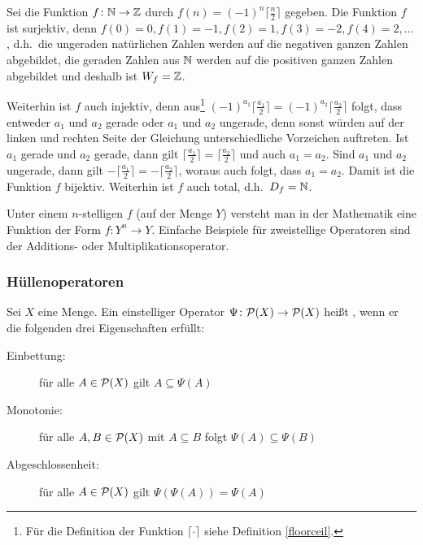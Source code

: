 \begin{example}
Sei die Funktion $f \colon \mathbb N \rightarrow \mathbb Z$ durch $f(n) = (-1)^n
\lceil \frac{n}{2} \rceil$ gegeben. Die Funktion $f$ ist surjektiv,
denn $f(0) = 0, f(1) = -1, f(2) = 1, f(3) = -2, f(4) = 2, \dots$, d.h.~die 
ungeraden natürlichen Zahlen werden auf die negativen ganzen Zahlen 
abgebildet, die geraden Zahlen aus $\mathbb N$ werden auf die positiven
ganzen Zahlen abgebildet und deshalb ist $W_f = \mathbb Z$.

Weiterhin ist $f$ auch injektiv, denn aus\footnote{Für die Definition
der Funktion $\lceil \cdot \rceil$ siehe Definition \ref{floorceil}.}
$(-1)^{a_1} \lceil \frac{a_1}{2} \rceil = (-1)^{a_2}
\lceil \frac{a_2}{2} \rceil$ folgt, dass entweder $a_1$ und $a_2$
gerade oder $a_1$ und $a_2$ ungerade, denn sonst würden auf der linken
und rechten Seite der Gleichung unterschiedliche Vorzeichen
auftreten. Ist $a_1$ gerade und $a_2$ gerade, dann gilt
$\lceil \frac{a_1}{2} \rceil = \lceil \frac{a_2}{2} \rceil$ und auch
$a_1 = a_2$. Sind $a_1$ und $a_2$ ungerade, dann gilt
$-\lceil \frac{a_1}{2} \rceil = -\lceil \frac{a_2}{2} \rceil$, woraus
auch folgt, dass $a_1 = a_2$.
%
Damit ist die Funktion $f$ bijektiv. Weiterhin ist $f$ auch total,
d.h.~$D_f = \mathbb N$.
\end{example}

\begin{definition}
Unter einem $n$-stelligen  $f$ (auf der Menge $Y$) versteht man in der Mathematik eine Funktion der Form $f \colon Y^n \rightarrow Y$.  Einfache Beispiele für zweistellige Operatoren sind der Additions- oder Multiplikationsoperator.
\end{definition}

\subsubsection{Hüllenoperatoren}

\begin{definition}
Sei $X$ eine Menge. Ein einstelliger Operator $\Psi \colon \mathcal{P}(X) \rightarrow \mathcal{P}(X)$ heißt , wenn er die folgenden drei Eigenschaften erfüllt:

\begin{description}
%
\item[Einbettung:] für alle $A \in \mathcal{P}(X)$ gilt $A \subseteq \Psi(A)$
%
\item[Monotonie:] für alle $A,B \in \mathcal{P}(X)$ mit $A \subseteq B$ folgt $\Psi(A) \subseteq \Psi(B)$
%
\item[Abgeschlossenheit:] für alle $A \in \mathcal{P}(X)$ gilt $\Psi(\Psi(A)) = \Psi(A)$
%
\end{description}
\end{definition}

